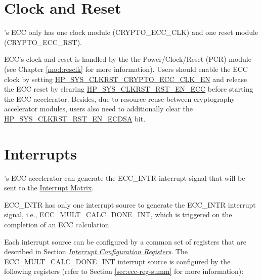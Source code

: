 \documentclass[main\_\_EN.tex]{subfiles}
\begin{document}
\section{Clock and Reset}
\label{sec:ecc-clkrst}

\chipname{}'s ECC only has one clock module (CRYPTO\_ECC\_CLK) and one reset module (CRYPTO\_ECC\_RST).

ECC's clock and reset is handled by the the Power/Clock/Reset (PCR) module (see Chapter \ref{mod:resclk} \textit{} for more information). Users should enable the ECC clock by setting \hyperref[fielddesc:HPSYSCLKRSTCRYPTOECCCLKEN]{HP\_SYS\_CLKRST\_CRYPTO\_ECC\_CLK\_EN} and release the ECC reset by clearing \hyperref[fielddesc:HPSYSCLKRSTRSTENECC]{HP\_SYS\_CLKRST\_RST\_EN\_ECC} before starting the ECC accelerator. Besides, due to resource reuse between cryptography accelerator modules, users also need to additionally clear the \hyperref[fielddesc:HPSYSCLKRSTRSTENECDSA]{HP\_SYS\_CLKRST\_RST\_EN\_ECDSA} bit.


\section{Interrupts}
\label{sec:ecc-interrupt}

\chipname{}'s ECC accelerator can generate the ECC\_INTR interrupt signal that will be sent to the \hyperref[mod:intmtrx]{Interrupt Matrix}.

ECC\_INTR has only one interrupt source to generate the ECC\_INTR interrupt signal, i.e., \label{int:ECCMULTCALCDONEINT}{ECC\_MULT\_CALC\_DONE\_INT}, which is triggered on the completion of an ECC calculation.

Each interrupt source can be configured by a common set of registers that are described in Section \hyperref[interrupt-config-registers]{\textit{Interrupt Configuration Registers}}. The ECC\_MULT\_CALC\_DONE\_INT interrupt source is configured by the following registers (refer to Section \ref{sec:ecc-reg-summ} \textit{} for more information):
\end{document}
